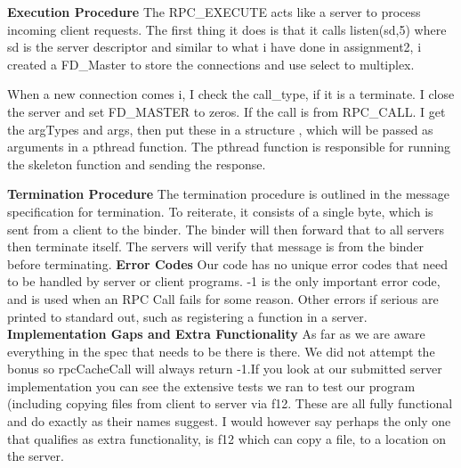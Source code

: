 \documentclass[]{article}
\begin{document}
\newline\newline
{\bf Execution Procedure}\newline
The RPC\_EXECUTE acts like a server  to process incoming client requests. The first thing it does is that it calls listen(sd,5) where sd is the server descriptor and similar to what i have done in assignment2, i created a FD\_Master to store the connections and use select to multiplex. 

When a new connection comes i, I check the call\_type, if it is a terminate. I close the server and set FD\_MASTER to zeros. If the call is from RPC\_CALL. I get the argTypes and args, then put these in a structure , which will be passed as arguments in a pthread function. The pthread function is responsible for running the skeleton function and sending the response. 

{\bf Termination Procedure}\newline
The termination procedure is outlined in the message specification for termination. To reiterate, it consists of a single byte, which is sent from a client to the binder. The binder will then forward that to all servers then terminate itself. The servers will verify that message is from the binder before terminating.\newline\newline
{\bf Error Codes}\newline
Our code has no unique error codes that need to be handled by server or client programs. -1 is the only important error code, and is used when an RPC Call fails for some reason. Other errors if serious are printed to standard out, such as registering a function in a server.\newline
\newline
{\bf Implementation Gaps and Extra Functionality}\newline
As far as we are aware everything in the spec that needs to be there is there. We did not attempt the bonus so rpcCacheCall will always return -1.\newline\newline If you look at our submitted server implementation you can see the extensive tests we ran to test our program (including copying files from client to server via f12. These are all fully functional and do exactly as their names suggest. I would however say perhaps the only one that qualifies as extra functionality, is f12 which can copy a file, to a location on the server.
\end{document}
